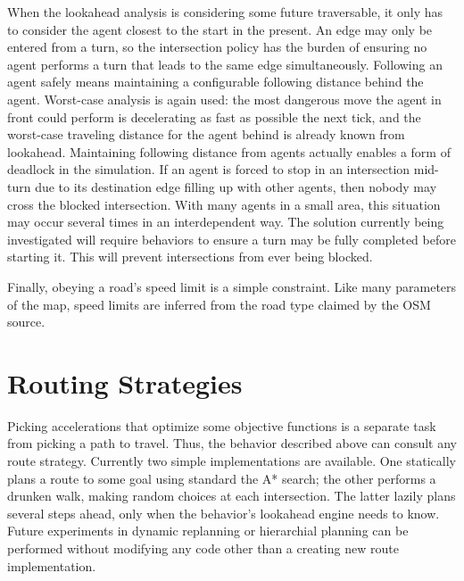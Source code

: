 \documentclass[letterpaper, 10 pt, conference]{ieeeconf}  %
\begin{document}
{When the lookahead analysis is considering some future traversable, it only has
to consider the agent closest to the start in the present. An edge may only be
entered from a turn, so the intersection policy has the burden of ensuring no
agent performs a turn that leads to the same edge simultaneously. Following an
agent safely means maintaining a configurable following distance behind the
agent. Worst-case analysis is again used: the most dangerous move the agent in
front could perform is decelerating as fast as possible the next tick, and the
worst-case traveling distance for the agent behind is already known from
lookahead. Maintaining following distance from agents actually enables a form of
deadlock in the simulation. If an agent is forced to stop in an intersection
mid-turn due to its destination edge filling up with other agents, then nobody
may cross the blocked intersection. With many agents in a small area, this
situation may occur several times in an interdependent way. The solution
currently being investigated will require behaviors to ensure a turn may be
fully completed before starting it. This will prevent intersections from ever
being blocked.

Finally, obeying a road's speed limit is a simple constraint. Like many
parameters of the map, speed limits are inferred from the road type claimed by
the OSM source.



\section{Routing Strategies}

Picking accelerations that optimize some objective functions is a separate task
from picking a path to travel. Thus, the behavior described above can consult
any route strategy. Currently two simple implementations are available. One
statically plans a route to some goal using standard the A* search; the other
performs a drunken walk, making random choices at each intersection. The latter
lazily plans several steps ahead, only when the behavior's lookahead engine
needs to know. Future experiments in dynamic replanning or hierarchial planning
can be performed without modifying any code other than a creating new route
implementation.

}
\end{document}
